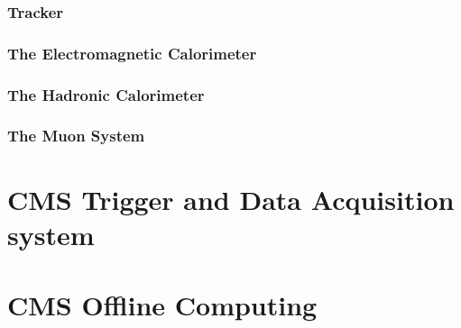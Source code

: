 
\subsubsection{Tracker} %
\label{ssub:tracker}

\subsubsection{The Electromagnetic Calorimeter} %
\label{sub:the_electromagnetic_calorimeter}

\subsubsection{The Hadronic Calorimeter} %
\label{sub:the_hadronic_calorimeter}

\subsubsection{The Muon System} %
\label{sub:the_muon_system}



\section{CMS Trigger and Data Acquisition system} %
\label{sec:cms_trigger_and_data_acquisition_system}


\section{CMS Offline Computing} %
\label{sec:cms_offline_computing}

